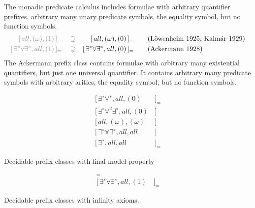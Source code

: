 \begin{example}
	The monadic predicate calculus includes formulae with arbitrary quantifier prefixes, 
	arbitrary many unary predicate symbols, the equality symbol, but no function symbols.
	\begin{align*}
	\colG [\,all, (\omega), (1)\,]_= 
	\quad\supsetneq& &
	[\,all, (\omega), (0 )&\,]_=
	\tag{Löwenheim 1925, Kalmár 1929}
	\\
	\colG [\,\exists^*\forall\exists^*,all,(1)\,]_=
	\quad\supsetneq& &
	[\,\exists^*\forall\exists^*,all,(0)&\,]_{=} \tag{Ackermann 1928}
	\end{align*}
	The Ackermann prefix class contains formulae with arbitrary many existential quantifiers, 
	but just one universal quantifier. It contains arbitrary many predicate symbols
	with arbitrary arities, the equality symbol, but no function symbols. 
\end{example}


\begin{table}[hbt]
	\begin{align*}
	[\,\exists^{∗}\forall^{∗}, all, (0)&\,]_{=} \tag{Bernays, Schönfinkel 1928, Ramsey 1932}
	\\
	[\,\exists^{∗}\forall^2\exists^{∗} , all, (0)&\,] \tag{Gödel 1932, Kalmár 1933, Schütte 1934}
	\\
	[\,all, (\omega), (\omega)&\,] \tag{Löb 1967, Gurevich 1969}
	\\
	[\,\exists^{∗}\forall\exists^{∗}, all, all&\,] \tag{Gurevich 1973}
	\\
	[\,\exists^{∗}, all, all&\,]_{=} \tag{Gurevich 1976}
	\end{align*}
	\caption[Decidable prefix classes]{Decidable prefix classes with final model property }
	\label{tab:decidedable:FiniteModelProperty}
\end{table}

\begin{table}[hbt]
	\begin{align*}
	[\,all, (\omega), (1)&\,]_{=} \tag{Rabin 1969} 
	\\
	[\,\exists^{∗}\forall\exists^{∗}, all, (1)&\,]_{=} \tag{Shelah 1977}
	\end{align*}
	\caption[Decidable prefix classes]{Decidable prefix classes with infinity axioms. }
	\label{tab:decidable:InfinityAxioms}
\end{table}

